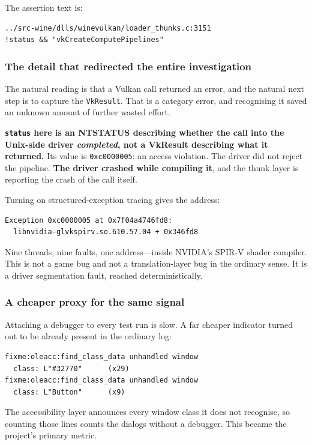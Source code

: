 The assertion text is:

\begin{lstlisting}
../src-wine/dlls/winevulkan/loader_thunks.c:3151
!status && "vkCreateComputePipelines"
\end{lstlisting}

\subsubsection{The detail that redirected the entire investigation}

The natural reading is that a Vulkan call returned an error, and the natural next
step is to capture the \verb|VkResult|. That is a category error, and recognising
it saved an unknown amount of further wasted effort.

\textbf{\texttt{status} here is an NTSTATUS describing whether the call into the
Unix-side driver \emph{completed}, not a VkResult describing what it
returned.} Its value is \verb|0xc0000005|: an access violation. The driver did
not reject the pipeline. \textbf{The driver crashed while compiling it}, and the
thunk layer is reporting the crash of the call itself.

Turning on structured-exception tracing gives the address:

\begin{lstlisting}
Exception 0xc0000005 at 0x7f04a4746fd8:
  libnvidia-glvkspirv.so.610.57.04 + 0x346fd8
\end{lstlisting}

Nine threads, nine faults, one address---inside NVIDIA's SPIR-V shader compiler.
This is not a game bug and not a translation-layer bug in the ordinary sense. It
is a driver segmentation fault, reached deterministically.

\subsubsection{A cheaper proxy for the same signal}

Attaching a debugger to every test run is slow. A far cheaper indicator turned
out to be already present in the ordinary log:

\begin{lstlisting}
fixme:oleacc:find_class_data unhandled window
  class: L"#32770"      (x29)
fixme:oleacc:find_class_data unhandled window
  class: L"Button"      (x9)
\end{lstlisting}

The accessibility layer announces every window class it does not recognise, so
counting those lines counts the dialogs without a debugger. This became the
project's primary metric.

